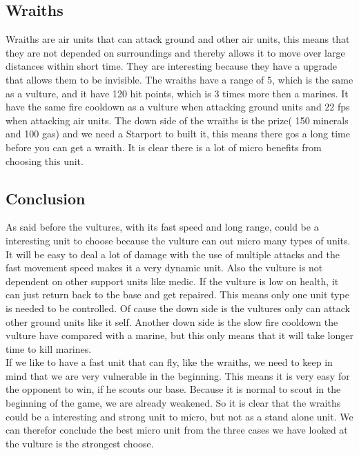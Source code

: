 \subsection{Wraiths}
Wraiths are air units that can attack ground and other air units, this means that they are not depended on surroundings and thereby allows it
to move over large distances within short time. They are interesting because they have a upgrade that allows them to be invisible. The wraiths 
have a range of 5, which is the same as a vulture, and it have 120 hit points, which is 3 times more then a marines. It have the same fire cooldown
as a vulture when attacking ground units and 22 fps when attacking air units.  
The down side of the wraiths is the prize( 150 minerals and 100 gas) and we need a Starport to built it, this means
there gos a long time before you can get a wraith. It is clear there is a lot of micro benefits from choosing this unit. 


\subsection{Conclusion}
As said before the vultures, with its fast speed and long range, could be a interesting unit to choose because the vulture can out micro many types of
units. It will be easy to deal a lot of damage with the use of multiple attacks and the fast movement speed makes it a very dynamic unit. Also the vulture
is not dependent on other support units like medic. If the vulture is low on health, it can just return back to the base and get repaired. This means
only one unit type is needed to be controlled. Of cause the down side is the vultures only can attack other ground units like it self. Another down side
is the slow fire cooldown the vulture have compared with a marine, but this only means that it will take longer time to kill marines.\\
If we like to have a fast unit that can fly, like the wraiths, we need to keep in mind that we are very vulnerable in the beginning. This means it is very
easy for the opponent to win, if he scouts our base. Because it is normal to scout in the beginning of the game, we are already weakened. So it is clear that
the wraiths could be a interesting and strong unit to micro, but not as a stand alone unit. We can therefor conclude the best micro unit from the three cases
we have looked at the vulture is the strongest choose.